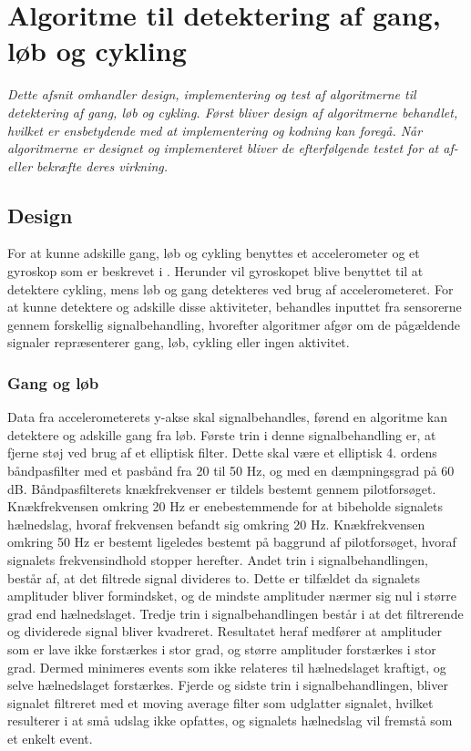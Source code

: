 \section{Algoritme til detektering af gang, løb og cykling}
\textit{Dette afsnit omhandler design, implementering og test af algoritmerne til detektering af gang, løb og cykling. Først bliver design af algoritmerne behandlet, hvilket er ensbetydende med at implementering og kodning kan foregå. Når algoritmerne er designet og implementeret bliver de efterfølgende testet for at af- eller bekræfte deres virkning.}

\subsection{Design}
For at kunne adskille gang, løb og cykling benyttes et accelerometer og et gyroskop som er beskrevet i . Herunder vil gyroskopet blive benyttet til at detektere cykling, mens løb og gang detekteres ved brug af accelerometeret. For at kunne detektere og adskille disse aktiviteter, behandles inputtet fra sensorerne gennem forskellig signalbehandling, hvorefter algoritmer afgør om de pågældende signaler repræsenterer gang, løb, cykling eller ingen aktivitet. 


\subsubsection{Gang og løb}
Data fra accelerometerets y-akse skal signalbehandles, førend en algoritme kan detektere og adskille gang fra løb. Første trin i denne signalbehandling er, at fjerne støj ved brug af et elliptisk filter. Dette skal være et elliptisk 4. ordens båndpasfilter med et pasbånd fra 20 til 50 Hz, og med en dæmpningsgrad på 60 dB. Båndpasfilterets knækfrekvenser er tildels bestemt gennem pilotforsøget. Knækfrekvensen omkring 20 Hz er enebestemmende for at bibeholde signalets hælnedslag, hvoraf frekvensen befandt sig omkring 20 Hz. Knækfrekvensen omkring 50 Hz er bestemt ligeledes bestemt på baggrund af pilotforsøget, hvoraf signalets frekvensindhold stopper herefter. Andet trin i signalbehandlingen, består af, at det filtrede signal divideres to. Dette er tilfældet da signalets amplituder bliver formindsket, og de mindste amplituder nærmer sig nul i større grad end hælnedslaget. Tredje trin i signalbehandlingen består i at det filtrerende og dividerede signal bliver kvadreret. Resultatet heraf medfører at amplituder som er lave ikke forstærkes i stor grad, og større amplituder forstærkes i stor grad. Dermed minimeres events som ikke relateres til hælnedslaget kraftigt, og selve hælnedslaget forstærkes. Fjerde og sidste trin i signalbehandlingen, bliver signalet filtreret med et moving average filter som udglatter signalet, hvilket resulterer i at små udslag ikke opfattes, og signalets hælnedslag vil fremstå som et enkelt event. \\

